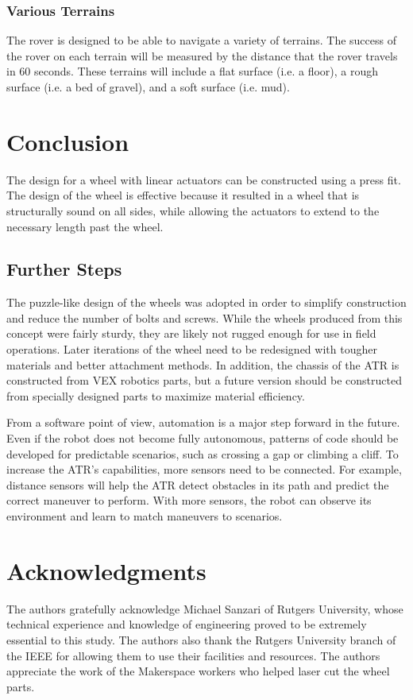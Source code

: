 \documentclass[12pt]{article}
\numberwithin{figure}{section}
\begin{document}
\begin{multicols}{2}
\subsubsection{Various Terrains}
The rover is designed to be able to navigate a variety of terrains.  The success of the rover on each terrain will be measured by the distance that the rover travels in 60 seconds. These terrains will include a flat surface (i.e. a floor), a rough surface (i.e. a bed of gravel), and a soft surface (i.e. mud).

\section{Conclusion}
The design for a wheel with linear actuators can be constructed using a press fit. The design of the wheel is effective because it resulted in a wheel that is structurally sound on all sides, while allowing the actuators to extend to the necessary length past the wheel.
\subsection{Further Steps}
The puzzle-like design of the wheels was adopted in order to simplify construction and reduce the number of bolts and screws. While the wheels produced from this concept were fairly sturdy, they are likely not rugged enough for use in field operations. Later iterations of the wheel need to be redesigned with tougher materials and better attachment methods. In addition, the chassis of the ATR is constructed from VEX robotics parts, but a future version should be constructed from specially designed parts to maximize material efficiency.

From a software point of view, automation is a major step forward in the future. Even if the robot does not become fully autonomous, patterns of code should be developed for predictable scenarios, such as crossing a gap or climbing a cliff. To increase the ATR’s capabilities, more sensors need to be connected. For example, distance sensors will help the ATR detect obstacles in its path and predict the correct maneuver to perform. With more sensors, the robot can observe its environment and learn to match maneuvers to scenarios.

\section{Acknowledgments}
The authors gratefully acknowledge Michael Sanzari of Rutgers University, whose technical experience and knowledge of engineering proved to be extremely essential to this study. The authors also thank the Rutgers University branch of the IEEE for allowing them to use their facilities and resources. The authors appreciate the work of the Makerspace workers who helped laser cut the wheel parts. 


\end{multicols}
\end{document}
